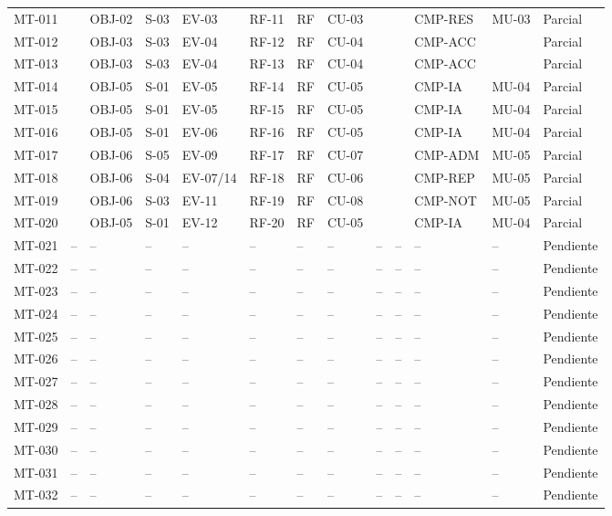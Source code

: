 \documentclass[12pt,journal,onecolumn]{IEEEtran}
\begin{document}
\begin{landscape}
\begin{longtable}{P{0.9cm}P{1.0cm}P{0.8cm}P{1.0cm}P{1.1cm}P{1.0cm}P{1.0cm}P{0.7cm}P{0.9cm}P{0.9cm}P{0.9cm}P{1.2cm}P{1.1cm}}
MT-011 &  & OBJ-02 & S-03 & EV-03 & RF-11 & RF & CU-03 &  &  & CMP-RES & MU-03 & Parcial\\
MT-012 &  & OBJ-03 & S-03 & EV-04 & RF-12 & RF & CU-04 &  &  & CMP-ACC &  & Parcial\\
MT-013 &  & OBJ-03 & S-03 & EV-04 & RF-13 & RF & CU-04 &  &  & CMP-ACC &  & Parcial\\
MT-014 &  & OBJ-05 & S-01 & EV-05 & RF-14 & RF & CU-05 &  &  & CMP-IA & MU-04 & Parcial\\
MT-015 &  & OBJ-05 & S-01 & EV-05 & RF-15 & RF & CU-05 &  &  & CMP-IA & MU-04 & Parcial\\
MT-016 &  & OBJ-05 & S-01 & EV-06 & RF-16 & RF & CU-05 &  &  & CMP-IA & MU-04 & Parcial\\
MT-017 &  & OBJ-06 & S-05 & EV-09 & RF-17 & RF & CU-07 &  &  & CMP-ADM & MU-05 & Parcial\\
MT-018 &  & OBJ-06 & S-04 & EV-07/14 & RF-18 & RF & CU-06 &  &  & CMP-REP & MU-05 & Parcial\\
MT-019 &  & OBJ-06 & S-03 & EV-11 & RF-19 & RF & CU-08 &  &  & CMP-NOT & MU-05 & Parcial\\
MT-020 &  & OBJ-05 & S-01 & EV-12 & RF-20 & RF & CU-05 &  &  & CMP-IA & MU-04 & Parcial\\
MT-021 & -- & -- & -- & -- & -- & -- & -- & -- & -- & -- & -- & Pendiente\\
MT-022 & -- & -- & -- & -- & -- & -- & -- & -- & -- & -- & -- & Pendiente\\
MT-023 & -- & -- & -- & -- & -- & -- & -- & -- & -- & -- & -- & Pendiente\\
MT-024 & -- & -- & -- & -- & -- & -- & -- & -- & -- & -- & -- & Pendiente\\
MT-025 & -- & -- & -- & -- & -- & -- & -- & -- & -- & -- & -- & Pendiente\\
MT-026 & -- & -- & -- & -- & -- & -- & -- & -- & -- & -- & -- & Pendiente\\
MT-027 & -- & -- & -- & -- & -- & -- & -- & -- & -- & -- & -- & Pendiente\\
MT-028 & -- & -- & -- & -- & -- & -- & -- & -- & -- & -- & -- & Pendiente\\
MT-029 & -- & -- & -- & -- & -- & -- & -- & -- & -- & -- & -- & Pendiente\\
MT-030 & -- & -- & -- & -- & -- & -- & -- & -- & -- & -- & -- & Pendiente\\
MT-031 & -- & -- & -- & -- & -- & -- & -- & -- & -- & -- & -- & Pendiente\\
MT-032 & -- & -- & -- & -- & -- & -- & -- & -- & -- & -- & -- & Pendiente\\

\end{longtable}
\end{landscape}
\end{document}
